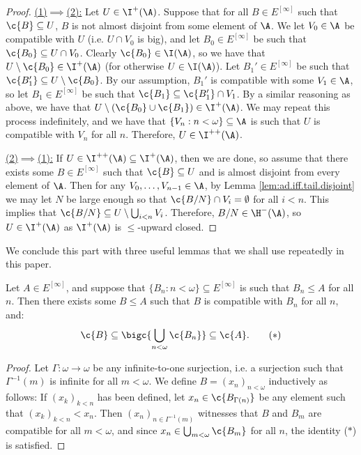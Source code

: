 \documentclass[11pt,reqno]{amsart}
\begin{document}
\begin{proof}    
    \underline{(1)$\implies$(2):} Let $U \in \I^+(\A)$. Suppose that for all $B \in E^{[\infty]}$ such that $\c{B} \subseteq U$, $B$ is not almost disjoint from some element of $\A$. We let $V_0 \in \A$ be compatible with $U$ (i.e. $U \cap V_0$ is big), and let $B_0 \in E^{[\infty]}$ be such that $\c{B_0} \subseteq U \cap V_0$. Clearly $\c{B_0} \in \I(\A)$, so we have that $U \setminus \c{B_0} \in \I^+(\A)$ (for otherwise $U \in \I(\A)$). Let $B_1' \in E^{[\infty]}$ be such that $\c{B_1'} \subseteq U \setminus \c{B_0}$. By our assumption, $B_1'$ is compatible with some $V_1 \in \A$, so let $B_1 \in E^{[\infty]}$ be such that $\c{B_1} \subseteq \c{B_1'} \cap V_1$. By a similar reasoning as above, we have that $U \setminus (\c{B_0} \cup \c{B_1}) \in \I^+(\A)$. We may repeat this process indefinitely, and we have that $\{V_n : n < \omega\} \subseteq \A$ is such that $U$ is compatible with $V_n$ for all $n$. Therefore, $U \in \I^{++}(\A)$.

    \underline{(2)$\implies$(1):} If $U \in \I^{++}(\A) \subseteq \I^+(\A)$, then we are done, so assume that there exists some $B \in E^{[\infty]}$ such that $\c{B} \subseteq U$ and is almost disjoint from every element of $\A$. Then for any $V_0,\dots,V_{n-1} \in \A$, by Lemma \ref{lem:ad.iff.tail.disjoint} we may let $N$ be large enough so that $\c{B/N} \cap V_i = \emptyset$ for all $i < n$. This implies that $\c{B/N} \subseteq U \setminus \bigcup_{i<n} V_i$. Therefore, $B/N \in \H^-(\A)$, so $U \in \I^+(\A)$ as $\I^+(\A)$ is $\leq$-upward closed.
\end{proof}

We conclude this part with three useful lemmas that we shall use repeatedly in this paper.

\begin{lemma}
\label{lem:infinite.compatibility.lemma.1}
    Let $A \in E^{[\infty]}$, and suppose that $\{B_n : n < \omega\} \subseteq E^{[\infty]}$ is such that $B_n \leq A$ for all $n$. Then there exists some $B \leq A$ such that $B$ is compatible with $B_n$ for all $n$, and:
    \begin{align*}
        \c{B} \subseteq \bigc{\bigcup_{n<\omega} \c{B_n}} \subseteq \c{A}. \tag{$*$}
    \end{align*}
\end{lemma}

\begin{proof}
    Let $\Gamma : \omega \to \omega$ be any infinite-to-one surjection, i.e. a surjection such that $\Gamma^{-1}(m)$ is infinite for all $m < \omega$. We define $B = (x_n)_{n<\omega}$ inductively as follows: If $(x_k)_{k<n}$ has been defined, let $x_n \in \c{B_{\Gamma(n)}}$ be any element such that $(x_k)_{k<n} < x_n$. Then $(x_n)_{n\in\Gamma^{-1}(m)}$ witnesses that $B$ and $B_m$ are compatible for all $m < \omega$, and since $x_n \in \bigcup_{m<\omega} \c{B_m}$ for all $n$, the identity ($*$) is satisfied. 
\end{proof}
\end{document}
